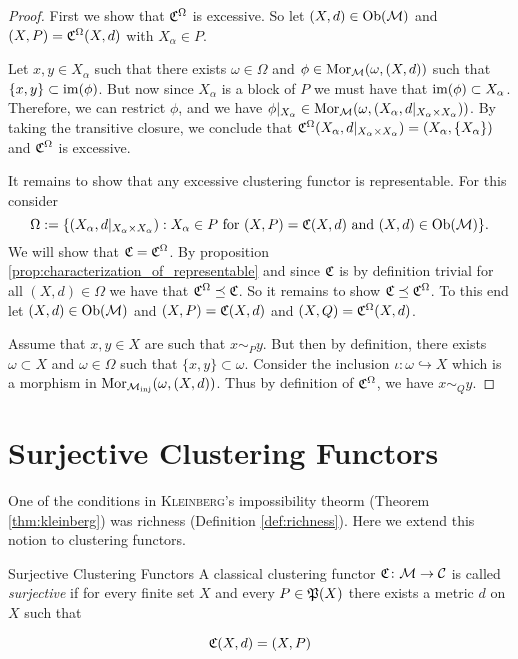 \begin{proof}
First we show that $\Cf^\Omega$ is excessive. So let $(X,d) \in \ob(\M)$ and $(X,P) = \Cf^\Omega(X,d)$ with $X_\alpha \in P$.

Let $x,y \in X_\alpha$ such that there exists $\omega \in \Omega$ and $\phi \in \mor_\M(\omega, (X,d))$ such that ${\{x,y\} \subset \image(\phi)}$. But now since $X_\alpha$ is a block of $P$ we must have that $\image(\phi) \subset X_\alpha$. Therefore, we can restrict $\phi$, and we have $\phi|_{X_\alpha} \in \mor_\M(\omega, (X_\alpha, d|_{X_\alpha \times X_\alpha}))$. By taking the transitive closure, we conclude that $\Cf^\Omega(X_\alpha, d|_{X_\alpha \times X_\alpha}) = (X_\alpha, \{X_\alpha\})$ and $\Cf^\Omega$ is excessive.

It remains to show that any excessive clustering functor is representable. For this consider
$$
\Omega := \{(X_\alpha, d|_{X_\alpha \times X_\alpha}): X_\alpha \in P \text{ for } (X, P) = \Cf(X,d) \text{ and } (X,d) \in \ob(\M)\}.
$$
We will show that $\Cf = \Cf^\Omega$. By proposition \ref{prop:characterization_of_representable} and since $\Cf$ is by definition trivial for all $(X,d) \in \Omega$ we have that $\Cf^\Omega \refines \Cf$. So it remains to show $\Cf \refines \Cf^\Omega$. To this end let $(X,d) \in \ob(\M)$ and $(X,P) = \Cf(X,d)$ and $(X,Q) = \Cf^\Omega(X,d)$.

Assume that $x,y \in X$ are such that $x \sim_P y$. But then by definition, there exists $\omega \subset X$ and $\omega \in \Omega$ such that $\{x,y\} \subset \omega$. Consider the inclusion $\iota: \omega \hookrightarrow X$ which is a morphism in $\mor_\inj(\omega, (X,d))$. Thus by definition of $\Cf^\Omega$, we have $x \sim_Q y$.

\end{proof}

\section{Surjective Clustering Functors}

One of the conditions in \textsc{Kleinberg}'s impossibility theorm (Theorem \ref{thm:kleinberg}) was richness (Definition \ref{def:richness}). Here we extend this notion to clustering functors.

\begin{definition}{Surjective Clustering Functors}{}
    A classical clustering functor $\Cf\colon \M \to \C$ is called \emph{surjective} if for every finite set $X$ and every $P \in \P(X)$ there exists a metric $d$ on $X$ such that

    \begin{equation*}
        \Cf(X,d) = (X,P)
    \end{equation*}

\end{definition}

